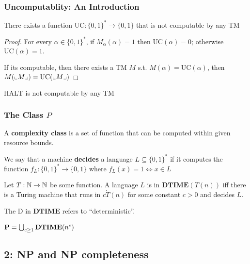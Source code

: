 \documentclass[11pt]{article}
\def \HALT {\text{HALT}}
\def \DTIME {\textbf{DTIME}}
\begin{document}
\subsubsection{Uncomputablity: An Introduction}
\label{sec:orgfb3e143}
\begin{theorem}[]
There exists a function \(\text{UC}:\{0,1\}^*\to\{0,1\}\) that is not computable by any TM
\end{theorem}

\begin{proof}
For every \(\alpha\in\{0,1\}^*\), if \(M_{\alpha}(\alpha)=1\) then \(\text{UC}(\alpha)=0\);
otherwise \(\text{UC}(\alpha)=1\).

If its computable, then there exists a TM \(M\) s.t. \(M(\alpha)=\text{UC}(\alpha)\), then
\(M(\llcorner M \lrcorner)=\text{UC}(\llcorner M \lrcorner)\)
\end{proof}

\begin{theorem}[]
\(\HALT\) is not computable by any TM
\end{theorem}

\subsubsection{The Class \texorpdfstring{\(P\)}{P}}
\label{sec:orgf8b9500}
A \textbf{complexity class} is a set of function that can be computed within given resource bounds.

We say that a machine \textbf{decides} a language \(L\subseteq\{0,1\}^*\) if it computes the
function \(f_L:\{0,1\}^*\to\{0,1\}\) where \(f_L(x)=1\Leftrightarrow x\in L\)

\begin{definition}[]
Let \(T:\mathbb{N}\to\mathbb{N}\) be some function. A language \(L\) is in \(\DTIME(T(n))\) iff there is a
Turing machine that runs in \(c\dot T(n)\) for some constant \(c>0\) and decides \(L\).
\end{definition}

The D in \(\DTIME\) refers to ``deterministic''.

\begin{definition}[]
\(\bP=\bigcup_{c\ge1}\DTIME(n^c)\)
\end{definition}

\subsection{2: NP and NP completeness}
\label{sec:org22cb458}
\end{document}
